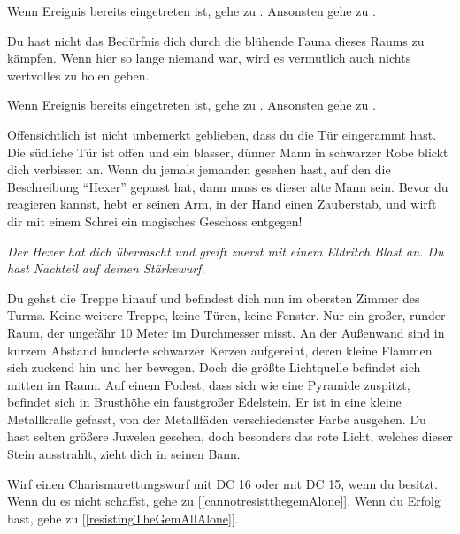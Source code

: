 Wenn Ereignis  bereits eingetreten ist, gehe zu .
Ansonsten gehe zu .


Du hast nicht das Bedürfnis dich durch die blühende Fauna dieses Raums zu kämpfen. Wenn hier so lange niemand war, wird es vermutlich auch nichts wertvolles zu holen geben.

Wenn Ereignis  bereits eingetreten ist, gehe zu .
Ansonsten gehe zu .


Offensichtlich ist nicht unbemerkt geblieben, dass du die Tür eingerammt hast. Die südliche Tür ist offen und ein blasser, dünner Mann in schwarzer Robe blickt dich verbissen an. Wenn du jemals jemanden gesehen hast, auf den die Beschreibung ``Hexer'' gepasst hat, dann muss es dieser alte Mann sein. Bevor du reagieren kannst, hebt er seinen Arm, in der Hand einen Zauberstab, und wirft dir mit einem Schrei ein magisches Geschoss entgegen!

\textit{Der Hexer hat dich überrascht und greift zuerst mit einem Eldritch Blast an. Du hast Nachteil auf deinen Stärkewurf.}



Du gehst die Treppe hinauf und befindest dich nun im obersten Zimmer des Turms. Keine weitere Treppe, keine Türen, keine Fenster. Nur ein großer, runder Raum, der ungefähr 10 Meter im Durchmesser misst. An der Außenwand sind in kurzem Abstand hunderte schwarzer Kerzen aufgereiht, deren kleine Flammen sich zuckend hin und her bewegen.
Doch die größte Lichtquelle befindet sich mitten im Raum. Auf einem Podest, dass sich wie eine Pyramide zuspitzt, befindet sich in Brusthöhe ein faustgroßer Edelstein. Er ist in eine kleine Metallkralle gefasst, von der Metallfäden verschiedenster Farbe ausgehen. Du hast selten größere Juwelen gesehen, doch besonders das rote Licht, welches dieser Stein ausstrahlt, zieht dich in seinen Bann.

Wirf einen Charismarettungswurf mit DC 16 oder mit DC 15, wenn du  besitzt. Wenn du es nicht schaffst, gehe zu [\ref{cannotresistthegemAlone}]. Wenn du Erfolg hast, gehe zu [\ref{resistingTheGemAllAlone}].

